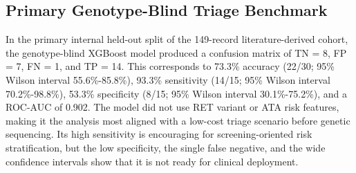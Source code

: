 \documentclass[12pt]{article}
\begin{document}
\begin{table}[ht]
\centering
\caption{Model comparison across the five algorithms under the default full-feature configuration, on the internal held-out split of both datasets. Sensitivity is the positive-class recall. Metrics are from the standard evaluation harness applied uniformly to every model.}
\label{tab:modelcomp}
\end{table}

\subsection{Primary Genotype-Blind Triage Benchmark}
In the primary internal held-out split of the 149-record literature-derived cohort, the genotype-blind XGBoost model produced a confusion matrix of TN = 8, FP = 7, FN = 1, and TP = 14. This corresponds to 73.3\% accuracy (22/30; 95\% Wilson interval 55.6\%-85.8\%), 93.3\% sensitivity (14/15; 95\% Wilson interval 70.2\%-98.8\%), 53.3\% specificity (8/15; 95\% Wilson interval 30.1\%-75.2\%), and a ROC-AUC of 0.902. The model did not use RET variant or ATA risk features, making it the analysis most aligned with a low-cost triage scenario before genetic sequencing. Its high sensitivity is encouraging for screening-oriented risk stratification, but the low specificity, the single false negative, and the wide confidence intervals show that it is not ready for clinical deployment.
\end{document}
